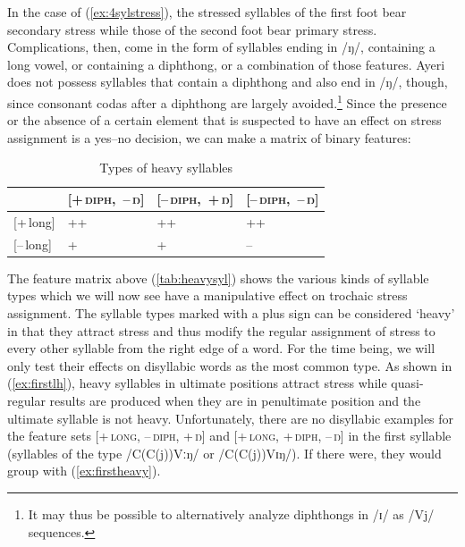In the case of (\ref{ex:4sylstress}), the stressed syllables of the first foot
bear secondary stress while those of the second foot bear primary stress.
Complications, then, come in the form of syllables ending in /ŋ/, containing a
long vowel, or containing a diphthong, or a combination of those features.
Ayeri does not possess syllables that contain a diphthong and
also end in /ŋ/, though, since consonant codas after a diphthong are largely
avoided.\footnote{It may thus be possible to alternatively analyze diphthongs
in /ɪ/ as /Vj/ sequences.} Since the presence or the absence of a certain
element that is suspected to have an effect on stress assignment is a yes–no
decision, we can make a matrix of binary features:

\begin{table}[h]\centering
\caption{Types of heavy syllables}
\scshape
\begin{tabu} to .75\linewidth {B X[c] X[c] X[c]}
\tableheaderfont\toprule

	& \mbox{\textsc{[+\,diph,~–\,ŋ]}}
	& \mbox{\textsc{[–\,diph,~+\,ŋ]}}
	& \mbox{\textsc{[–\,diph,~–\,ŋ]}}
	\\
	
\toprule

[+\,long]
	& ++
	& ++
	& ++
	\\

[–\,long]
	& +
	& +
	& –
	\\

\bottomrule
\end{tabu}
\label{tab:heavysyl}
\end{table}

The feature matrix above (\autoref{tab:heavysyl}) shows the various kinds of
syllable types which we will now see have a manipulative effect on trochaic
stress assignment. The syllable types marked with a plus sign can be considered
`heavy' in that they attract stress and thus modify the regular assignment of
stress to every other syllable from the right edge of a word. For the time
being, we will only test their effects on disyllabic words as the most common
type. As shown in (\ref{ex:firstlh}), heavy syllables in ultimate positions
attract stress while quasi-regular results are produced when they are in
penultimate position and the ultimate syllable is not heavy. Unfortunately,
there are no disyllabic examples for the feature sets \textsc{[+\,long,
\mbox{–\,diph,} +\,ŋ]} and \textsc{[+\,long, +\,diph, –\,ŋ]} in the first
syllable (syllables of the type /C(C(j))Vːŋ/ or /C(C(j))Vɪŋ/). If there were,
they would group with (\ref{ex:firstheavy}).

